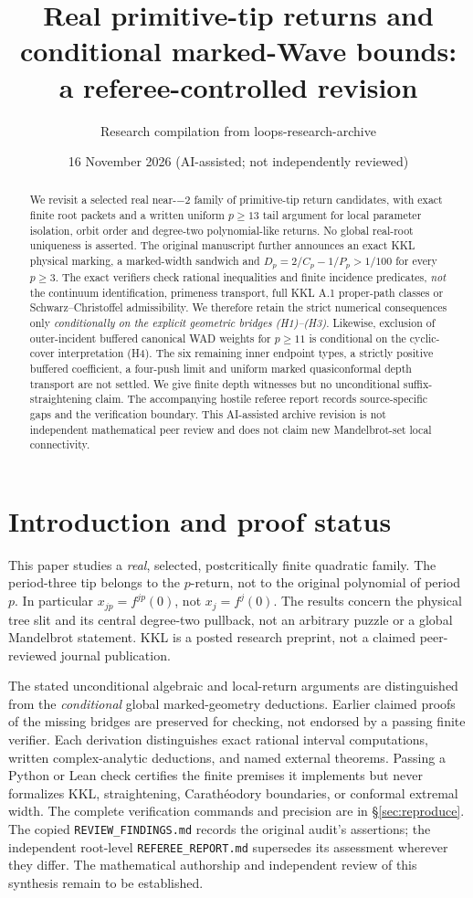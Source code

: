 \documentclass[11pt,reqno]{amsart}
\title[Real primitive tips: conditional geometry]{Real primitive-tip returns and conditional marked-Wave bounds:\\ a referee-controlled revision}
\author{Research compilation from loops-research-archive}
\date{16 November 2026 (AI-assisted; not independently reviewed)}
\numberwithin{equation}{section}
\theoremstyle{definition}
\begin{document}
\begin{abstract}
We revisit a selected real near-$-2$ family of primitive-tip return
candidates, with exact finite root packets and a written uniform
$p\ge13$ tail argument for local parameter isolation, orbit order and
degree-two polynomial-like returns.  No global real-root uniqueness
is asserted.  The original manuscript further announces an exact
KKL physical marking, a marked-width sandwich and
$D_p=2/C_p-1/P_p>1/100$ for every $p\ge3$.
The exact verifiers check rational inequalities and finite
incidence predicates, \emph{not} the continuum identification,
primeness transport, full KKL A.1 proper-path classes or
Schwarz--Christoffel admissibility.  We therefore retain the
strict numerical consequences only \emph{conditionally on the
explicit geometric bridges (H1)--(H3)}.  Likewise, exclusion of
outer-incident buffered canonical WAD weights for $p\ge11$
is conditional on the cyclic-cover interpretation (H4).
The six remaining inner endpoint types, a strictly positive
buffered coefficient, a four-push limit and uniform
marked quasiconformal depth transport are not settled.
We give finite depth witnesses but no unconditional
suffix-straightening claim.  The accompanying hostile
referee report records source-specific gaps and the
verification boundary.  This AI-assisted archive revision
is not independent mathematical peer review and
does not claim new Mandelbrot-set local connectivity.
\end{abstract}
\maketitle
\tableofcontents
\section{Introduction and proof status}
This paper studies a \emph{real}, selected, postcritically finite quadratic family.  The period-three tip belongs to the $p$-return, not to the original polynomial of period $p$.  In particular $x_{jp}=f^{jp}(0)$, not $x_j=f^j(0)$.  The results concern the physical tree slit and its central degree-two pullback, not an arbitrary puzzle or a global Mandelbrot statement.  KKL \cite{KKL2026} is a posted research preprint, not a claimed peer-reviewed journal publication.

The stated unconditional algebraic and local-return arguments are distinguished from the \emph{conditional} global marked-geometry deductions.  Earlier claimed proofs of the missing bridges are preserved for checking, not endorsed by a passing finite verifier.  Each derivation distinguishes exact rational interval computations, written complex-analytic deductions, and named external theorems.  Passing a Python or Lean check certifies the finite premises it implements but never formalizes KKL, straightening, Carath\'eodory boundaries, or conformal extremal width.  The complete verification commands and precision are in \S\ref{sec:reproduce}.  The copied \texttt{REVIEW\_FINDINGS.md} records the original audit's assertions; the independent root-level \texttt{REFEREE\_REPORT.md} supersedes its assessment wherever they differ.  The mathematical authorship and independent review of this synthesis remain to be established.









\end{document}
